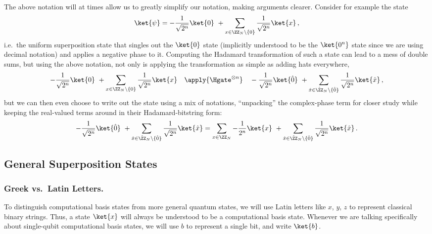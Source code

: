       The above notation will at times allow us to greatly simplify our
        notation, making arguments clearer. Consider for example the state
        \[
          \ket{\psi} = 
          -\frac{1}{\sqrt{2^n}} \ket{0}\
          +
          \sum_{x \in \ZZ_N \backslash \{0\}} 
          \frac{1}{\sqrt{2^n}} \ket{x}\, ,
        \]
        i.e.\ the uniform superposition state that singles out the $\ket{0}$ state (implicitly
        understood to be the $\ket{0^n}$ state since we are using decimal notation) 
        and applies a negative phase to it. Computing the Hadamard transformation of
        such a state can lead to a mess of double sums, but using the above
        notation, not only is applying the transformation as simple as adding
        hats everywhere,
        \[
          - \frac{1}{\sqrt{2^n}} \ket{0}\
          +
          \sum_{x \in \ZZ_N \backslash \{0\}} 
          \frac{1}{\sqrt{2^n}} \ket{x}
          \quad
          \apply{\Hgate^{\otimes n}} 
          \quad
          - \frac{1}{\sqrt{2^n}} \ket{\hat{0}}\ +
          \sum_{\hat x \in \hat{\ZZ}_N \backslash \{\hat{0}\}} 
          \frac{1}{\sqrt{2^n}} \ket{\hat{x}}\, ,
        \]
        but we can then even choose to write out the state using a mix of
        notations, ``unpacking'' the complex-phase term for closer study while keeping 
        the real-valued terms around in their Hadamard-bitstring form:
        \[
          -\frac{1}{\sqrt{2^n}} \ket{\hat{0}}\ +
          \sum_{\hat x \in \hat{\ZZ}_N \backslash \{\hat{0}\}} 
          \frac{1}{\sqrt{2^n}} \ket{\hat{x}}
          =
          \sum_{x \in \ZZ_N} -\frac{1}{2^n} \ket{x}\ +
          \sum_{\hat x \in \hat{\ZZ}_N \backslash \{\hat{0}\}} 
          \frac{1}{\sqrt{2^n}} \ket{\hat{x}}\, .
        \]

 
  \subsection{General Superposition States}
    \subsubsection{Greek vs.\ Latin Letters.}
      To distinguish computational basis states from more general quantum states, we will use
        Latin letters like $x$, $y$, $z$ to represent classical binary
        strings. Thus, a state $\ket{x}$ will always be understood to be a
        computational basis state. Whenever we are talking specifically about single-qubit
        computational basis states, we will use $b$ to represent a single bit, 
        and write $\ket{b}$. 

